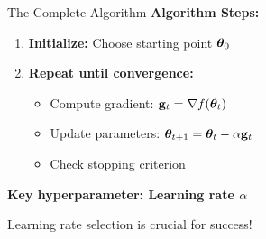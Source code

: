 \documentclass[usenames,dvipsnames]{beamer}
\begin{document}
  \begin{frame}{The Complete Algorithm}
    \textbf{Algorithm Steps:}
    \begin{enumerate}[<+->]
        \item \textbf{Initialize:} Choose starting point $\boldsymbol{\theta}_0$
        \item \textbf{Repeat until convergence:}
        \begin{itemize}
            \item Compute gradient: $\mathbf{g}_t = \nabla f(\boldsymbol{\theta}_t)$
            \item Update parameters: $\boldsymbol{\theta}_{t+1} = \boldsymbol{\theta}_t - \alpha \mathbf{g}_t$  
            \item Check stopping criterion
        \end{itemize}
    \end{enumerate}
    
    \pause
    \textbf{Key hyperparameter: Learning rate $\alpha$}
    
    \pause
    \begin{keypointsbox}{}
    Learning rate selection is crucial for success!
    \end{keypointsbox}
  \end{frame}
\end{document}
